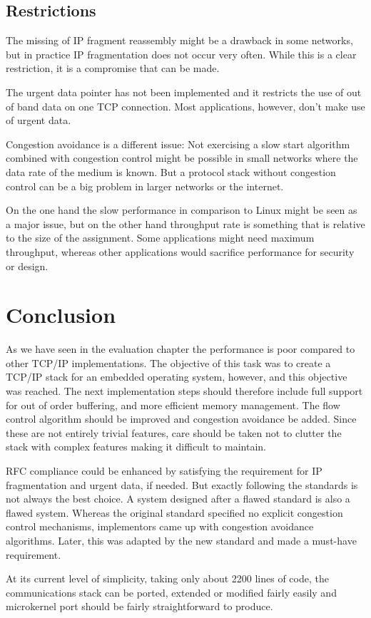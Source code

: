 \documentclass[11pt,twoside,abstract,notitlepage]{scrreprt}
\begin{document}
\section{Restrictions}
The missing of IP fragment reassembly might be a drawback in some networks, but in practice IP fragmentation does not occur very often. While this is a clear restriction, it is a compromise that can be made. 

The urgent data pointer has not been implemented and it restricts the use of out of band data on one TCP connection. Most applications, however, don't make use of urgent data.

Congestion avoidance is a different issue: Not exercising a slow start algorithm combined with congestion control might be possible in small networks where the data rate of the medium is known. But a protocol stack without congestion control can be a big problem in larger networks or the internet. 

On the one hand the slow performance in comparison to Linux might be seen as a major issue, but on the other hand throughput rate is something that is relative to the size of the assignment. Some applications might need maximum throughput, whereas other applications would sacrifice performance for security or design. 

\chapter{Conclusion} 
As we have seen in the evaluation chapter the performance is poor compared to other TCP/IP implementations. The objective of this task was to create a TCP/IP stack for an embedded operating system, however, and this objective was reached. The next implementation steps should therefore include full support for out of order buffering, and more efficient memory management. The flow control algorithm should be improved and congestion avoidance be added. Since these are not entirely trivial features, care should be taken not to clutter the stack with complex features making it difficult to maintain. 

RFC compliance could be enhanced by satisfying the requirement for IP fragmentation and urgent data, if needed. But exactly following the standards is not always the best choice. A system designed after a flawed standard is also a flawed system. Whereas the original standard specified no explicit congestion control mechanisms, implementors came up with congestion avoidance algorithms. Later, this was adapted by the new standard and made a must-have requirement. 

At its current level of simplicity, taking only about 2200 lines of code, the communications stack can be ported, extended or modified fairly easily and microkernel port should be fairly straightforward to produce. 

\newpage



\end{document}
